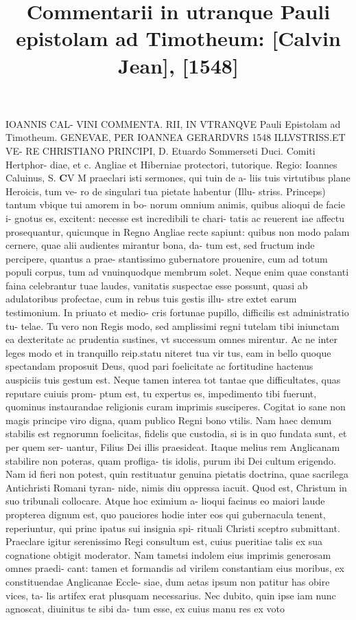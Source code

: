 \documentclass{article}
\begin{document}
\date{}
        \title{Commentarii in utranque Pauli epistolam ad Timotheum: [Calvin Jean], [1548]}
\maketitle
\tableofcontents
\clearpage
\begin{pages} 
\beginnumbering
        IOANNIS CAL- VINI COMMENTA. RII, IN VTRANQVE Pauli Epistolam ad Timotheum. GENEVAE, PER IOANNEA GERARDVRS 1548 ILLVSTRISS.ET VE- RE CHRISTIANO PRINCIPI, D. Etuardo Sommerseti Duci. Comiti Hertphor- diae, et c. Angliae et Hiberniae protectori, tutorique. Regio: Ioannes Caluinus, S. \pstart \huge\textbf{C}\normalsize V M praeclari isti sermones, qui tuin de a- liis tuis virtutibus plane Heroicis, tum ve- ro de singulari tua pietate habentur (Illu- striss. Princeps) tantum vbique tui amorem in bo- norum omnium animis, quibus alioqui de facie i- gnotus es, excitent: necesse est incredibili te chari- tatis ac reuerent iae affectu prosequantur, quicunque in Regno Angliae recte sapiunt: quibus non modo palam cernere, quae alii audientes mirantur bona, da- tum est, sed fructum inde percipere, quantus a prae- stantissimo gubernatore prouenire, cum ad totum populi corpus, tum ad vnuinquodque membrum solet. Neque enim quae constanti faina celebrantur tuae laudes, vanitatis suspectae esse possunt, quasi ab adulatoribus profectae, cum in rebus tuis gestis illu- stre extet earum testimonium. In priuato et medio- cris fortunae pupillo, difficilis est administratio tu- telae. Tu vero non Regis modo, sed amplissimi regni tutelam tibi iniunctam ea dexteritate ac prudentia sustines, vt successum omnes mirentur. Ac ne inter leges modo et in tranquillo reip.statu niteret tua vir  \pend\pstart tus, eam in bello quoque spectandam proposuit Deus, quod pari foelicitate ac fortitudine hactenus auspiciis tuis gestum est. Neque tamen interea tot tantae que difficultates, quas reputare cuiuis prom- ptum est, tu expertus es, impedimento tibi fuerunt, quominus instaurandae religionis curam imprimis susciperes. Cogitat io sane non magis principe viro digna, quam publico Regni bono vtilis. Nam haec demum stabilis est regnorumn foelicitas, fidelis que custodia, si is in quo fundata sunt, et per quem ser- uantur, Filius Dei illis praesideat. Itaque melius rem Anglicanam stabilire non poteras, quam profliga- tis idolis, purum ibi Dei cultum erigendo. Nam id fieri non potest, quin restituatur genuina pietatis doctrina, quae sacrilega Antichristi Romani tyran- nide, nimis diu oppressa iacuit. Quod est, Christum in suo tribunali collocare. Atque hoc eximium a- lioqui facinus eo maiori laude propterea dignum est, quo pauciores hodie inter eos qui gubernacula tenent, reperiuntur, qui princ ipatus sui insignia spi- rituali Christi sceptro submittant. Praeclare igitur serenissimo Regi consultum est, cuius pueritiae talis ex sua cognatione obtigit moderator. Nam tametsi indolem eius imprimis generosam omnes praedi- cant: tamen et formandis ad virilem constantiam eius moribus, ex constituendae Anglicanae Eccle- siae, dum aetas ipsum non patitur has obire vices, ta-  \pend\pstart lis artifex erat plusquam necessarius. Nec dubito, quin ipse iam nunc agnoscat, diuinitus te sibi da- tum esse, ex cuius manu res ex voto 
\end{pages}
\end{document}
